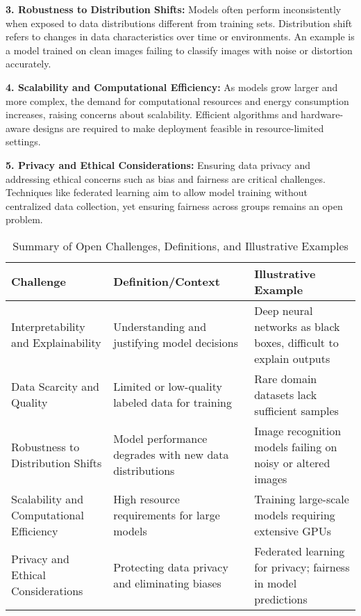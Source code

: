 \documentclass[sigconf]{acmart}
\begin{document}
\textbf{3. Robustness to Distribution Shifts:} Models often perform inconsistently when exposed to data distributions different from training sets. Distribution shift refers to changes in data characteristics over time or environments. An example is a model trained on clean images failing to classify images with noise or distortion accurately.

\textbf{4. Scalability and Computational Efficiency:} As models grow larger and more complex, the demand for computational resources and energy consumption increases, raising concerns about scalability. Efficient algorithms and hardware-aware designs are required to make deployment feasible in resource-limited settings.

\textbf{5. Privacy and Ethical Considerations:} Ensuring data privacy and addressing ethical concerns such as bias and fairness are critical challenges. Techniques like federated learning aim to allow model training without centralized data collection, yet ensuring fairness across groups remains an open problem.

\begin{table*}[htbp]
\centering
\caption{Summary of Open Challenges, Definitions, and Illustrative Examples}
\label{tab:open_challenges}
\begin{adjustbox}{max width=\textwidth}
\begin{tabular}{@{}lll@{}}
\toprule
\textbf{Challenge} & \textbf{Definition/Context} & \textbf{Illustrative Example} \\ \midrule
Interpretability and Explainability & Understanding and justifying model decisions & Deep neural networks as black boxes, difficult to explain outputs \\
Data Scarcity and Quality & Limited or low-quality labeled data for training & Rare domain datasets lack sufficient samples \\
Robustness to Distribution Shifts & Model performance degrades with new data distributions & Image recognition models failing on noisy or altered images \\
Scalability and Computational Efficiency & High resource requirements for large models & Training large-scale models requiring extensive GPUs \\
Privacy and Ethical Considerations & Protecting data privacy and eliminating biases & Federated learning for privacy; fairness in model predictions \\ \bottomrule
\end{tabular}
\end{adjustbox}
\end{table*}
\end{document}
